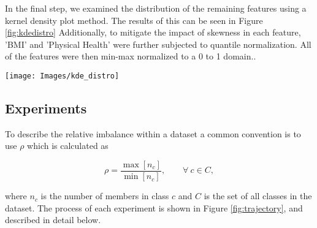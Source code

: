 \documentclass[journal]{IEEEtran}
\begin{document}
	In the final step, we examined the distribution of the remaining features using a kernel density plot method.
	The results of this can be seen in Figure \ref{fig:kdedistro}
	Additionally, to mitigate the impact of skewness in each feature, 'BMI' and 'Physical Health' were further subjected to quantile normalization.
	All of the features were then min-max normalized to a 0 to 1 domain.. 

	\begin{figure*}
		\centering
		\texttt{[image: Images/kde\_distro]}
		\caption{Kernel Densities of Features.}
		\label{fig:kdedistro}
	\end{figure*}

\subsection{Experiments}

	To describe the relative imbalance within a dataset a common convention is to use $\rho$ which is calculated as

	\begin{equation}
		\rho = \frac{\max[n_c]}{\min[n_c]}, \qquad \forall\ c \in C,
	\end{equation}
	
	where $n_c$ is the number of members in class $c$ and $C$ is the set of all classes in the dataset.
	The process of each experiment is shown in Figure \ref{fig:trajectory}, and described in detail below.
\end{document}
